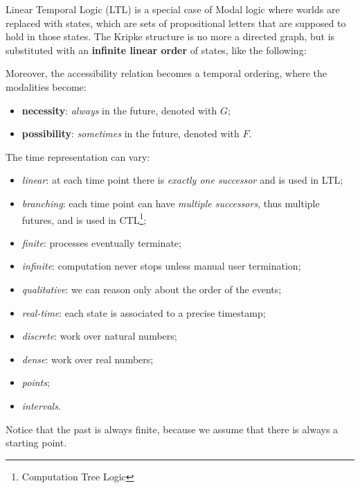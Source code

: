 \documentclass[oneside]{academica}
\begin{document}
Linear Temporal Logic (LTL) is a special case of Modal logic where worlds are replaced with states, which are sets of propositional letters that are supposed to hold in those states.
The Kripke structure is no more a directed graph, but is substituted with an \textbf{infinite linear order} of states, like the following:
\begin{center}
  
\end{center}
Moreover, the accessibility relation becomes a temporal ordering, where the modalities become:
\begin{itemize}
  \item \textbf{necessity}: \textit{always} in the future, denoted with $G$;
  \item \textbf{possibility}: \textit{sometimes} in the future, denoted with $F$.
\end{itemize}

\bigskip
The time representation can vary:
\begin{itemize}
  \item \emph{linear}: at each time point there is \textit{exactly one successor} and is used in LTL;
    \begin{center}
      
    \end{center}
  \item \emph{branching}: each time point can have \textit{multiple successors}, thus multiple futures, and is used in CTL\footnote{Computation Tree Logic};
    \begin{center}
      
    \end{center}
  \item \emph{finite}: processes eventually terminate;
    \begin{center}
      
    \end{center}
  \item \emph{infinite}: computation never stops unless manual user termination;
    \begin{center}
      
    \end{center}
  \item \emph{qualitative}: we can reason only about the order of the events;
  \item \emph{real-time}: each state is associated to a precise timestamp;
  \item \emph{discrete}: work over natural numbers;
    \begin{center}
      
    \end{center}
  \item \emph{dense}: work over real numbers;
    \begin{center}
      
    \end{center}
  \item \emph{points};
  \item \emph{intervals}.
\end{itemize}
\begin{note}
  Notice that the past is always finite, because we assume that there is always a starting point.
\end{note}
\end{document}
